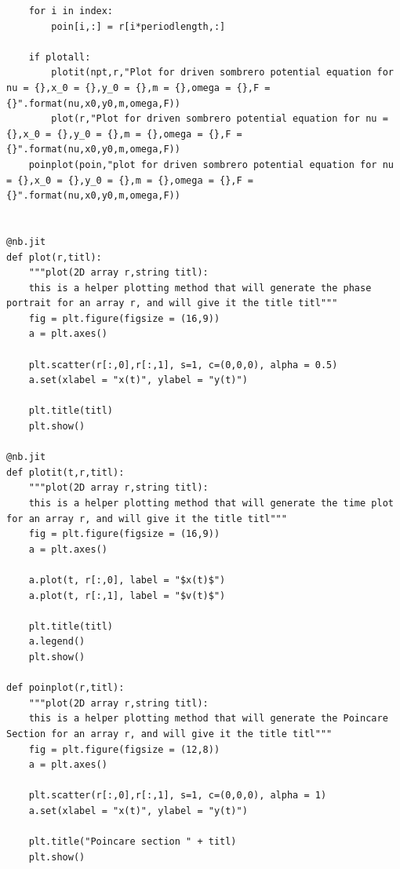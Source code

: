 \documentclass[aps,pra,notitlepage,amsmath,amssymb,letterpaper,12pt]{revtex4-1}
\theoremstyle{definition}
\begin{document}
\begin{lstlisting}
    for i in index:
        poin[i,:] = r[i*periodlength,:]
    
    if plotall:
        plotit(npt,r,"Plot for driven sombrero potential equation for nu = {},x_0 = {},y_0 = {},m = {},omega = {},F = {}".format(nu,x0,y0,m,omega,F))
        plot(r,"Plot for driven sombrero potential equation for nu = {},x_0 = {},y_0 = {},m = {},omega = {},F = {}".format(nu,x0,y0,m,omega,F))
    poinplot(poin,"plot for driven sombrero potential equation for nu = {},x_0 = {},y_0 = {},m = {},omega = {},F = {}".format(nu,x0,y0,m,omega,F))

    
@nb.jit
def plot(r,titl):
    """plot(2D array r,string titl):
    this is a helper plotting method that will generate the phase portrait for an array r, and will give it the title titl"""
    fig = plt.figure(figsize = (16,9))
    a = plt.axes()
    
    plt.scatter(r[:,0],r[:,1], s=1, c=(0,0,0), alpha = 0.5)
    a.set(xlabel = "x(t)", ylabel = "y(t)")
    
    plt.title(titl)
    plt.show()
    
@nb.jit
def plotit(t,r,titl):
    """plot(2D array r,string titl):
    this is a helper plotting method that will generate the time plot for an array r, and will give it the title titl"""
    fig = plt.figure(figsize = (16,9))
    a = plt.axes()
 
    a.plot(t, r[:,0], label = "$x(t)$")
    a.plot(t, r[:,1], label = "$v(t)$")
    
    plt.title(titl)
    a.legend()
    plt.show()
    
def poinplot(r,titl):
    """plot(2D array r,string titl):
    this is a helper plotting method that will generate the Poincare Section for an array r, and will give it the title titl"""
    fig = plt.figure(figsize = (12,8))
    a = plt.axes()
    
    plt.scatter(r[:,0],r[:,1], s=1, c=(0,0,0), alpha = 1)
    a.set(xlabel = "x(t)", ylabel = "y(t)")
    
    plt.title("Poincare section " + titl)
    plt.show()

\end{lstlisting}
\end{document}
